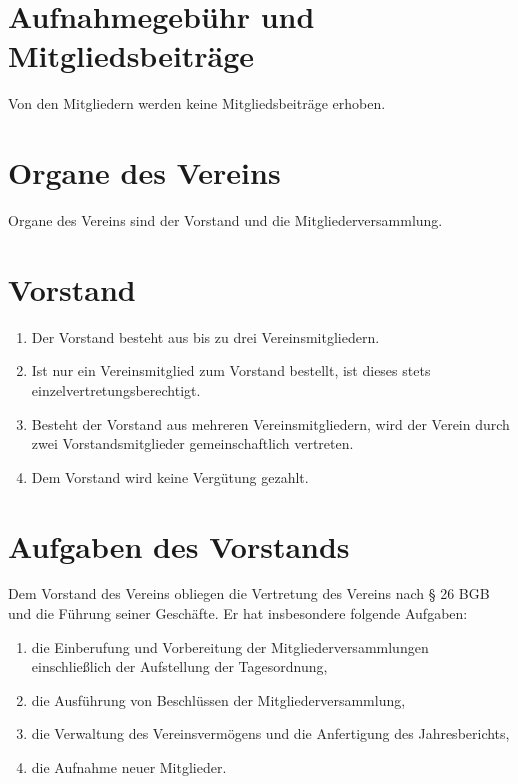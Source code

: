 \section{Aufnahmegebühr und Mitgliedsbeiträge}
Von den Mitgliedern werden keine Mitgliedsbeiträge erhoben.

\section{Organe des Vereins}
Organe des Vereins sind der Vorstand und die Mitgliederversammlung.

\section{Vorstand}
\begin{enumerate}[label=(\arabic*)]
    \item Der Vorstand besteht aus bis zu drei Vereinsmitgliedern.
    \item Ist nur ein Vereinsmitglied zum Vorstand bestellt, ist dieses stets
        einzelvertretungsberechtigt.
    \item Besteht der Vorstand aus mehreren Vereinsmitgliedern, wird der Verein
        durch zwei Vorstandsmitglieder gemeinschaftlich vertreten.
    \item Dem Vorstand wird keine Vergütung gezahlt.
\end{enumerate}

\section{Aufgaben des Vorstands}
Dem Vorstand des Vereins obliegen die Vertretung des Vereins nach § 26 BGB und
die Führung seiner Geschäfte. Er hat insbesondere folgende Aufgaben:
\begin{enumerate}[label=\alph*)]
    \item die Einberufung und Vorbereitung der Mitgliederversammlungen
        einschließlich der Aufstellung der Tagesordnung,
    \item die Ausführung von Beschlüssen der Mitgliederversammlung,
    \item die Verwaltung des Vereinsvermögens und die Anfertigung des Jahresberichts,
    \item die Aufnahme neuer Mitglieder.
\end{enumerate}

